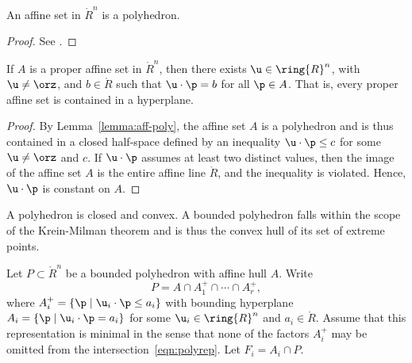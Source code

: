 \begin{lemma}[]\cutrate{}\label{lemma:aff-poly}
An affine set in $\ring{R}^n$ is a polyhedron.
\end{lemma}

\begin{proof} See \cite[Cor~1.4.2]{webster:1994}.
\end{proof}

\begin{lemma}[]\label{lemma:aff-u}
If $A$ is a proper affine set in $\ring{R}^n$, then there exists $\u\in \ring{R}^n$, with
$\u\ne\orz$, and $b\in\ring{R}$ 
such that $\u\cdot\p = b$ for all $\p\in A$.  That is, every proper affine set
is contained in a hyperplane.
\end{lemma}

\begin{proof}
By Lemma~\ref{lemma:aff-poly},
the affine set $A$ is a polyhedron and is thus contained in a closed half-space defined by an
inequality $\u\cdot\p \le c$ for some $\u\ne \orz$ and $c$.  If $\u\cdot\p$ assumes
at least two distinct values, then the image of the affine set $A$ 
is the entire affine line $\ring{R}$, and the inequality is violated.
Hence, $\u\cdot\p$ is constant on $A$.
\end{proof}

A polyhedron is closed and convex.  A bounded polyhedron falls within
the scope of the Krein-Milman theorem and is thus the convex hull of
its set of extreme points.  %

Let $P\subset\ring{R}^n$ be a bounded polyhedron with affine hull
$A$. Write
\begin{equation}\label{eqn:polyrep}
P = A \cap A^+_1 \cap \cdots \cap A^+_r,
\end{equation}
where $A^+_i = \{\p\mid \u_i\cdot \p \le a_i\}$ with bounding
hyperplane $A_i=\{\p\mid \u_i \cdot \p = a_i\}$ for some $\u_i\in
\ring{R}^n$ and $a_i\in\ring{R}$.  Assume that this representation is
minimal in the sense that none of the factors $A^+_i$ may be omitted from
the intersection~\eqref{eqn:polyrep}.
Let $F_i = A_i\cap P$.  %


